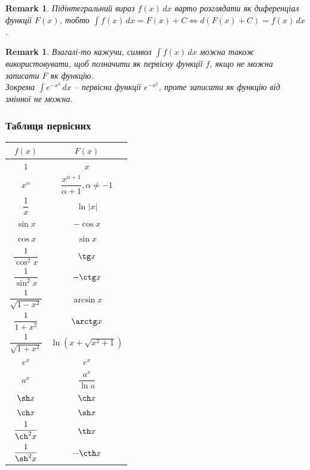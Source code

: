 \documentclass[a4paper, 10pt]{article}
\def\huge{\displaystyle}
\theoremstyle{theoremdd}
\theoremstyle{theoremdd}
\theoremstyle{theoremdd}
\theoremstyle{theoremdd}
\theoremstyle{theoremdd}
\theoremstyle{theoremdd}
\theoremstyle{theoremdd}
\newtheorem{remark}[theorem]{Remark}
\theoremstyle{theoremdd}
\theoremstyle{theoremdd}
\begin{document}
\begin{remark}
Підінтегральний вираз $f(x)\,dx$ варто розглядати як диференціал функції $F(x)$, тобто $\huge\int f(x)\,dx = F(x) + C \iff d(F(x)+C) = f(x)\,dx$.
\end{remark}

\begin{remark}
Взагалі-то кажучи, символ $\huge\int f(x)\,dx$ можна також використовувати, щоб позначити як первісну функції $f$, якщо не можна записати $F$ як функцію.\\
Зокрема $\huge\int e^{-x^2}\,dx$ -- первісна функції $e^{-x^2}$, проте записати як функцію від змінної не можна.
\end{remark}

\subsubsection*{Таблиця первісних}
\begin{center}
\begin{tabular}{ c|c } 
 $f(x)$ & $F(x)$ \\
 \hline 
 $1$ & $x$ \\ [2ex]
 \hline 
 $x^\alpha$ & $\dfrac{x^{\alpha+1}}{\alpha+1}, \alpha \neq -1$ \\ [2ex]
 \hline
 $\dfrac{1}{x}$ & $\ln |x|$ \\ [2ex]
 \hline
 $\sin x$ & $-\cos x$\\ [2ex]
 \hline 
 $\cos x$ & $\sin x$\\ [2ex]
 \hline
 $\dfrac{1}{\cos^2 x}$ & $\tg x$\\ [2ex]
 \hline 
 $\dfrac{1}{\sin^2 x}$ & $-\ctg x$\\ [2ex]
 \hline
 $\dfrac{1}{\sqrt{1-x^2}}$ & $\arcsin x$\\ [2ex]
 \hline
 $\dfrac{1}{1+x^2}$ & $\arctg x$\\ [2ex]
 \hline
 $\dfrac{1}{\sqrt{1+x^2}}$ & $\ln(x+\sqrt{x^2+1})$\\ [2ex]
 \hline
 $e^x$ & $e^x$ \\ [2ex]
 \hline 
 $a^x$ & $\dfrac{a^x}{\ln a}$ \\ [2ex]
 \hline
 $\sh x$ & $\ch x$ \\ [2ex]
 \hline
 $\ch x$ & $\sh x$ \\ [2ex]
 \hline
 $\dfrac{1}{\ch^2 x}$ & $\th x$\\ [2ex]
 \hline
 $\dfrac{1}{\sh^2 x}$ & $-\cth x$\\
\end{tabular}
\end{center}
\end{document}
